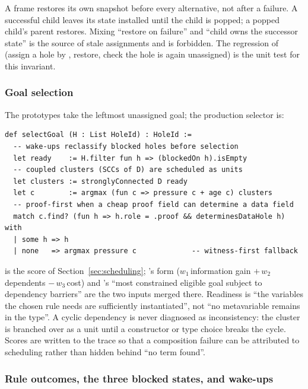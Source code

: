 \begin{invariant}
A frame restores its own snapshot before every alternative, not after a failure. A successful child leaves its state installed until the child is popped; a popped child's parent restores. Mixing ``restore on failure'' and ``child owns the successor state'' is the source of stale assignments and is forbidden. The  regression of  (assign a hole by , restore, check the hole is again unassigned) is the unit test for this invariant.
\end{invariant}

\subsubsection{Goal selection}\label{alg:select}

The prototypes take the leftmost unassigned goal; the production selector is:

\begin{lstlisting}
def selectGoal (H : List HoleId) : HoleId :=
  -- wake-ups reclassify blocked holes before selection
  let ready    := H.filter fun h => (blockedOn h).isEmpty
  -- coupled clusters (SCCs of D) are scheduled as units
  let clusters := stronglyConnected D ready
  let c        := argmax (fun c => pressure c + age c) clusters
  -- proof-first when a cheap proof field can determine a data field
  match c.find? (fun h => h.role = .proof && determinesDataHole h) with
  | some h => h
  | none   => argmax pressure c             -- witness-first fallback
\end{lstlisting}

 is the score of Section~\ref{sec:scheduling}; 's form ($w_1\,$information gain $+\,w_2\,$dependents $-\,w_3\,$cost) and 's ``most constrained eligible goal subject to dependency barriers'' are the two inputs merged there. Readiness is ``the variables the chosen rule needs are sufficiently instantiated'', not ``no metavariable remains in the type''. A cyclic dependency is never diagnosed as inconsistency: the cluster is branched over as a unit until a constructor or type choice breaks the cycle. Scores are written to the trace so that a composition failure can be attributed to scheduling rather than hidden behind ``no term found''.

\subsubsection{Rule outcomes, the three blocked states, and wake-ups}

